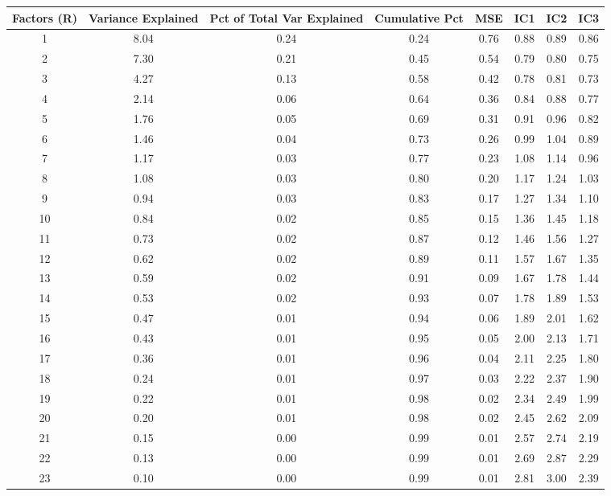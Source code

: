 \documentclass[11pt, letterpaper]{article}\usepackage[]{graphicx}\usepackage[]{color}
\begin{document}
\begin{table}[H]
\centering
\begingroup\scriptsize
\begin{tabular}{cccccccc}
  \hline
Factors (R) & Variance Explained & Pct of Total Var Explained & Cumulative Pct & MSE & IC1 & IC2 & IC3 \\ 
  \hline
  1 & 8.04 & 0.24 & 0.24 & 0.76 & 0.88 & 0.89 & 0.86 \\ 
    2 & 7.30 & 0.21 & 0.45 & 0.54 & 0.79 & 0.80 & 0.75 \\ 
    3 & 4.27 & 0.13 & 0.58 & 0.42 & 0.78 & 0.81 & 0.73 \\ 
    4 & 2.14 & 0.06 & 0.64 & 0.36 & 0.84 & 0.88 & 0.77 \\ 
    5 & 1.76 & 0.05 & 0.69 & 0.31 & 0.91 & 0.96 & 0.82 \\ 
    6 & 1.46 & 0.04 & 0.73 & 0.26 & 0.99 & 1.04 & 0.89 \\ 
    7 & 1.17 & 0.03 & 0.77 & 0.23 & 1.08 & 1.14 & 0.96 \\ 
    8 & 1.08 & 0.03 & 0.80 & 0.20 & 1.17 & 1.24 & 1.03 \\ 
    9 & 0.94 & 0.03 & 0.83 & 0.17 & 1.27 & 1.34 & 1.10 \\ 
   10 & 0.84 & 0.02 & 0.85 & 0.15 & 1.36 & 1.45 & 1.18 \\ 
   11 & 0.73 & 0.02 & 0.87 & 0.12 & 1.46 & 1.56 & 1.27 \\ 
   12 & 0.62 & 0.02 & 0.89 & 0.11 & 1.57 & 1.67 & 1.35 \\ 
   13 & 0.59 & 0.02 & 0.91 & 0.09 & 1.67 & 1.78 & 1.44 \\ 
   14 & 0.53 & 0.02 & 0.93 & 0.07 & 1.78 & 1.89 & 1.53 \\ 
   15 & 0.47 & 0.01 & 0.94 & 0.06 & 1.89 & 2.01 & 1.62 \\ 
   16 & 0.43 & 0.01 & 0.95 & 0.05 & 2.00 & 2.13 & 1.71 \\ 
   17 & 0.36 & 0.01 & 0.96 & 0.04 & 2.11 & 2.25 & 1.80 \\ 
   18 & 0.24 & 0.01 & 0.97 & 0.03 & 2.22 & 2.37 & 1.90 \\ 
   19 & 0.22 & 0.01 & 0.98 & 0.02 & 2.34 & 2.49 & 1.99 \\ 
   20 & 0.20 & 0.01 & 0.98 & 0.02 & 2.45 & 2.62 & 2.09 \\ 
   21 & 0.15 & 0.00 & 0.99 & 0.01 & 2.57 & 2.74 & 2.19 \\ 
   22 & 0.13 & 0.00 & 0.99 & 0.01 & 2.69 & 2.87 & 2.29 \\ 
   23 & 0.10 & 0.00 & 0.99 & 0.01 & 2.81 & 3.00 & 2.39 \\ 

\end{tabular}
\end{table}
\end{document}
